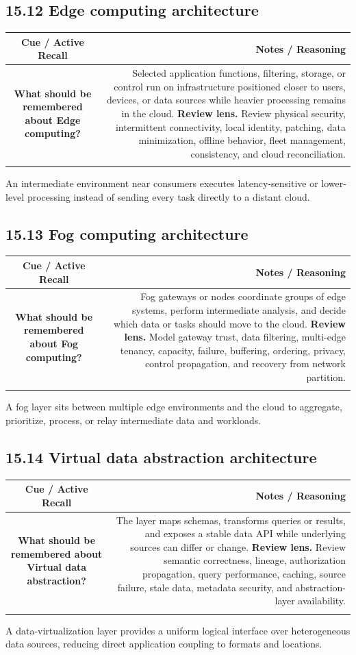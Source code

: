 \documentclass[11pt]{article}
\newcommand{\CornellHeader}{\rowcolor{Navy}\color{white}\bfseries Cue / Active Recall & \color{white}\bfseries Notes / Reasoning \\\endhead}
\newcommand{\CornellRow}[2]{\cellcolor{CueGray}\textbf{#1} & #2 \\\addlinespace[3pt]}
\begin{document}
\subsection{15.12 Edge computing architecture}
\begin{longtable}{@{}C N@{}}
\CornellHeader
\CornellRow{What should be remembered about Edge computing?}{Selected application functions, filtering, storage, or control run on infrastructure positioned closer to users, devices, or data sources while heavier processing remains in the cloud. \textbf{Review lens.} Review physical security, intermittent connectivity, local identity, patching, data minimization, offline behavior, fleet management, consistency, and cloud reconciliation.}
\end{longtable}
\begin{sectionsummarybox}
An intermediate environment near consumers executes latency-sensitive or lower-level processing instead of sending every task directly to a distant cloud.
\end{sectionsummarybox}
\subsection{15.13 Fog computing architecture}
\begin{longtable}{@{}C N@{}}
\CornellHeader
\CornellRow{What should be remembered about Fog computing?}{Fog gateways or nodes coordinate groups of edge systems, perform intermediate analysis, and decide which data or tasks should move to the cloud. \textbf{Review lens.} Model gateway trust, data filtering, multi-edge tenancy, capacity, failure, buffering, ordering, privacy, control propagation, and recovery from network partition.}
\end{longtable}
\begin{sectionsummarybox}
A fog layer sits between multiple edge environments and the cloud to aggregate, prioritize, process, or relay intermediate data and workloads.
\end{sectionsummarybox}
\subsection{15.14 Virtual data abstraction architecture}
\begin{longtable}{@{}C N@{}}
\CornellHeader
\CornellRow{What should be remembered about Virtual data abstraction?}{The layer maps schemas, transforms queries or results, and exposes a stable data API while underlying sources can differ or change. \textbf{Review lens.} Review semantic correctness, lineage, authorization propagation, query performance, caching, source failure, stale data, metadata security, and abstraction-layer availability.}
\end{longtable}
\begin{sectionsummarybox}
A data-virtualization layer provides a uniform logical interface over heterogeneous data sources, reducing direct application coupling to formats and locations.
\end{sectionsummarybox}
\end{document}
